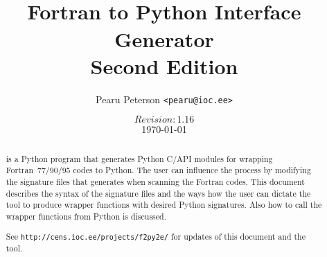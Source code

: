 \documentclass{article}
\title{\fpy\\Fortran to Python Interface Generator\\{\large Second Edition}}
\author{Pearu Peterson \texttt{<pearu@ioc.ee>}}
\date{$Revision: 1.16 $\\\today}
\begin{document}

\maketitle
\begin{abstract}
  \fpy is a Python program that generates Python C/API modules for
  wrapping Fortran~77/90/95 codes to Python. The user can influence the
  process by modifying the signature files that \fpy generates when
  scanning the Fortran codes. This document describes the syntax of
  the signature files and the ways how the user can dictate the tool
  to produce wrapper functions with desired Python signatures. Also
  how to call the wrapper functions from Python is discussed.

  See \texttt{http://cens.ioc.ee/projects/f2py2e/} for updates of this
  document and the tool. 
\end{abstract}

\tableofcontents







\appendix


\end{document}
